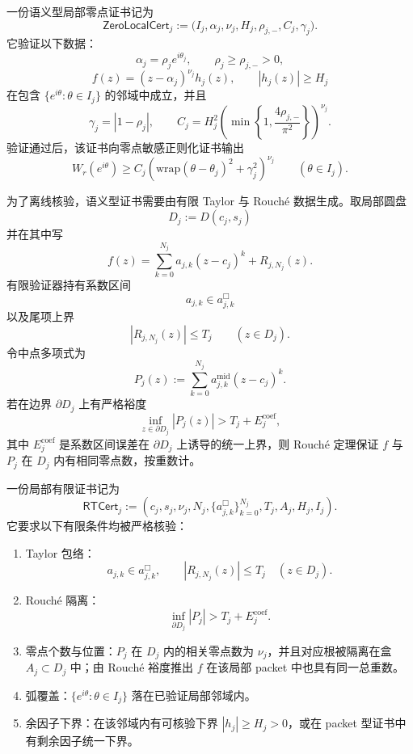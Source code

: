 \begin{definition}[语义型局部零点证书]\label{def:typed-address-biaxial-completion-semantic-local-zero-certificate}
一份语义型局部零点证书记为
\[
\mathsf{ZeroLocalCert}_j
:=
\bigl(
I_j,\alpha_j,\nu_j,H_j,\rho_{j,-},C_j,\gamma_j
\bigr).
\]
它验证以下数据：
\[
\alpha_j=\rho_j e^{i\theta_j},
\qquad
\rho_j\ge\rho_{j,-}>0,
\]
\[
f(z)=(z-\alpha_j)^{\nu_j}h_j(z),
\qquad
|h_j(z)|\ge H_j
\]
在包含 \(\{e^{i\theta}:\theta\in I_j\}\) 的邻域中成立，并且
\[
\gamma_j=|1-\rho_j|,
\qquad
C_j=
H_j^2
\left(
\min\left\{1,\frac{4\rho_{j,-}}{\pi^2}\right\}
\right)^{\nu_j}.
\]
验证通过后，该证书向零点敏感正则化证书输出
\[
W_r(e^{i\theta})
\ge
C_j\left(\mathrm{wrap}(\theta-\theta_j)^2+\gamma_j^2\right)^{\nu_j}
\qquad(\theta\in I_j).
\]
\end{definition}

为了离线核验，语义型证书需要由有限 Taylor 与 Rouch\'e 数据生成。取局部圆盘
\[
D_j:=D(c_j,s_j)
\]
并在其中写
\[
f(z)
=
\sum_{k=0}^{N_j}a_{j,k}(z-c_j)^k
+
R_{j,N_j}(z).
\]
有限验证器持有系数区间
\[
a_{j,k}\in a_{j,k}^{\Box}
\]
以及尾项上界
\[
|R_{j,N_j}(z)|\le T_j
\qquad(z\in D_j).
\]
令中点多项式为
\[
P_j(z):=
\sum_{k=0}^{N_j}a_{j,k}^{\mathrm{mid}}(z-c_j)^k.
\]
若在边界 \(\partial D_j\) 上有严格裕度
\[
\inf_{z\in\partial D_j}|P_j(z)|
>
T_j+E_j^{\mathrm{coef}},
\]
其中 \(E_j^{\mathrm{coef}}\) 是系数区间误差在 \(\partial D_j\) 上诱导的统一上界，则 Rouch\'e 定理保证 \(f\) 与 \(P_j\) 在 \(D_j\) 内有相同零点数，按重数计。

\begin{definition}\label{def:typed-address-biaxial-completion-rouche-taylor-local-certificate}
一份局部有限证书记为
\[
\mathsf{RTCert}_j
:=
\left(
c_j,s_j,\nu_j,N_j,
\{a_{j,k}^{\Box}\}_{k=0}^{N_j},
T_j,A_j,H_j,I_j
\right).
\]
它要求以下有限条件均被严格核验：
\begin{enumerate}
  \item Taylor 包络：
  \[
  a_{j,k}\in a_{j,k}^{\Box},
  \qquad
  |R_{j,N_j}(z)|\le T_j
  \quad(z\in D_j).
  \]
  \item Rouch\'e 隔离：
  \[
  \inf_{\partial D_j}|P_j|
  >
  T_j+E_j^{\mathrm{coef}}.
  \]
  \item 零点个数与位置：\(P_j\) 在 \(D_j\) 内的相关零点数为 \(\nu_j\)，并且对应根被隔离在盒 \(A_j\subset D_j\) 中；由 Rouch\'e 裕度推出 \(f\) 在该局部 packet 中也具有同一总重数。
  \item 弧覆盖：\(\{e^{i\theta}:\theta\in I_j\}\) 落在已验证局部邻域内。
  \item 余因子下界：在该邻域内有可核验下界 \(|h_j|\ge H_j>0\)，或在 packet 型证书中有剩余因子统一下界。
\end{enumerate}
\end{definition}

